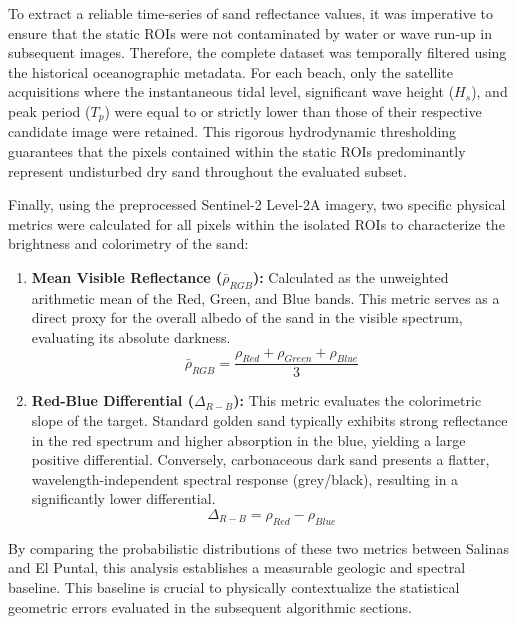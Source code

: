 ﻿\documentclass[ENG]{TFUOC}%
\begin{document}
To extract a reliable time-series of sand reflectance values, it was imperative to ensure that the static ROIs were not contaminated by water or wave run-up in subsequent images. Therefore, the complete dataset was temporally filtered using the historical oceanographic metadata. For each beach, only the satellite acquisitions where the instantaneous tidal level, significant wave height ($H_s$), and peak period ($T_p$) were equal to or strictly lower than those of their respective candidate image were retained. This rigorous hydrodynamic thresholding guarantees that the pixels contained within the static ROIs predominantly represent undisturbed dry sand throughout the evaluated subset.

Finally, using the preprocessed Sentinel-2 Level-2A imagery, two specific physical metrics were calculated for all pixels within the isolated ROIs to characterize the brightness and colorimetry of the sand:

\begin{enumerate}
    \item \textbf{Mean Visible Reflectance ($\bar{\rho}_{RGB}$):} Calculated as the unweighted arithmetic mean of the Red, Green, and Blue bands. This metric serves as a direct proxy for the overall albedo of the sand in the visible spectrum, evaluating its absolute darkness.
    \begin{equation}
        \bar{\rho}_{RGB} = \frac{\rho_{Red} + \rho_{Green} + \rho_{Blue}}{3}
    \end{equation}

    \item \textbf{Red-Blue Differential ($\Delta_{R-B}$):} This metric evaluates the colorimetric slope of the target. Standard golden sand typically exhibits strong reflectance in the red spectrum and higher absorption in the blue, yielding a large positive differential. Conversely, carbonaceous dark sand presents a flatter, wavelength-independent spectral response (grey/black), resulting in a significantly lower differential.
    \begin{equation}
        \Delta_{R-B} = \rho_{Red} - \rho_{Blue}
    \end{equation}
\end{enumerate}

By comparing the probabilistic distributions of these two metrics between Salinas and El Puntal, this analysis establishes a measurable geologic and spectral baseline. This baseline is crucial to physically contextualize the statistical geometric errors evaluated in the subsequent algorithmic sections.
\end{document}
